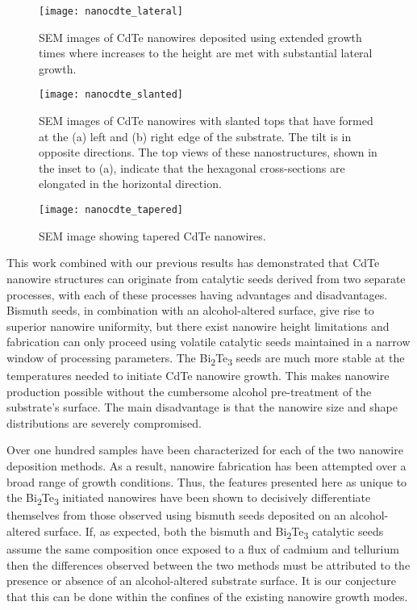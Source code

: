 \begin{figure}
 \centering \texttt{[image: nanocdte\_lateral]}
 \caption[CdTe nanowire lateral growth]{\label{fig:nanocdte_lateral}SEM images of CdTe nanowires deposited using extended growth times where increases to the height are met with substantial lateral growth.}
\end{figure}
\begin{figure}
 \centering \texttt{[image: nanocdte\_slanted]}
 \caption[CdTe nanowires with slanted tops]{\label{fig:nanocdte_slanted}SEM images of CdTe nanowires with slanted tops that have formed at the (a) left and (b) right edge of the substrate.
  The tilt is in opposite directions.
  The top views of these nanostructures, shown in the inset to (a), indicate that the hexagonal cross-sections are elongated in the horizontal direction.}
\end{figure}
\begin{figure}
 \centering \texttt{[image: nanocdte\_tapered]}
 \caption{\label{fig:nanocdte_tapered}SEM image showing tapered CdTe nanowires.}
\end{figure}
This work combined with our previous results has demonstrated that CdTe nanowire structures can originate from catalytic seeds derived from two separate processes, with each of these processes having advantages and disadvantages.
Bismuth seeds, in combination with an alcohol-altered surface, give rise to superior nanowire uniformity, but there exist nanowire height limitations and fabrication can only proceed using volatile catalytic seeds maintained in a narrow window of processing parameters.
The Bi\textsubscript{2}Te\textsubscript{3} seeds are much more stable at the temperatures needed to initiate CdTe nanowire growth.
This makes nanowire production possible without the cumbersome alcohol pre-treatment of the substrate's surface.
The main disadvantage is that the nanowire size and shape distributions are severely compromised.

Over one hundred samples have been characterized for each of the two nanowire deposition methods.
As a result, nanowire fabrication has been attempted over a broad range of growth conditions.
Thus, the features presented here as unique to the Bi\textsubscript{2}Te\textsubscript{3} initiated nanowires have been shown to decisively differentiate themselves from those observed using bismuth seeds deposited on an alcohol-altered surface.
If, as expected, both the bismuth and Bi\textsubscript{2}Te\textsubscript{3} catalytic seeds assume the same composition once exposed to a flux of cadmium and tellurium then the differences observed between the two methods must be attributed to the presence or absence of an alcohol-altered substrate surface.
It is our conjecture that this can be done within the confines of the existing nanowire growth modes.

